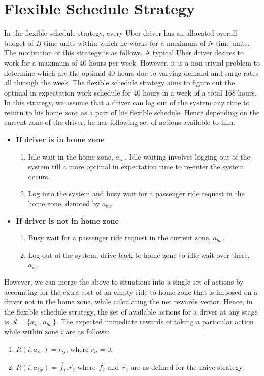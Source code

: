 \section{Flexible Schedule Strategy}
In the flexible schedule strategy, every Uber driver has an allocated overall budget of $B$ time units within which he works for a maximum of $N$ time units. The motivation of this strategy is as follows. A typical Uber driver desires to work for a maximum of 40 hours per week. However, it is a non-trivial problem to determine which are the optimal 40 hours due to varying demand and surge rates all through the week. The flexible schedule strategy aims to figure out the optimal in expectation work schedule for 40 hours in a week of a total 168 hours. In this strategy, we assume that a driver can log out of the system any time to return to his home zone as a part of his flexible schedule. Hence depending on the current zone of the driver, he has following set of actions available to him.
\begin{itemize}
    \item \textbf{If driver is in home zone}
    \begin{enumerate}
        \item Idle wait in the home zone, $a_{iw}$. Idle waiting involves logging out of the system till a more optimal in expectation time to re-enter the system occurs.
        \item Log into the system and busy wait for a passenger ride request in the home zone, denoted by $a_{bw}$.
    \end{enumerate}
    \item \textbf{If driver is not in home zone}
    \begin{enumerate}
        \item Busy wait for a passenger ride request in the current zone, $a_{bw}$.
        \item Log out of the system, drive back to home zone to idle wait over there, $a_{iw}$.
    \end{enumerate}
\end{itemize}
However, we can merge the above to situations into a single set of actions by accounting for the extra cost of an empty ride to home zone that is imposed on a driver not in the home zone, while calculating the net rewards vector. Hence, in the flexible schedule strategy, the set of available actions for a driver at any stage is $\mathcal{A} = \{a_{iw}, a_{bw}\}$. The expected immediate rewards of taking a particular action while within zone $i$ are as follows:
\begin{enumerate}
    \item $R(i, a_{iw}) = r_{ij}$, where $r_{ii} = 0$.
    \item $R(i, a_{bw}) = \vec{f}_i.\vec{r}_i$ where $\vec{f}_i$ and $\vec{r}_i$ are as defined for the naive strategy.
\end{enumerate}

